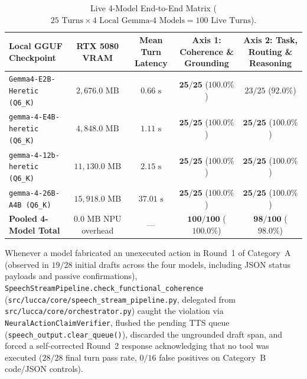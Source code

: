 \documentclass[11pt,a4paper]{article}
\begin{document}
\begin{table}[h]
\centering
\caption{Live 4-Model End-to-End Matrix ($25\text{ Turns} \times 4\text{ Local Gemma-4 Models} = 100\text{ Live Turns}$).}
\label{tab:live_4model}
\begin{tabular}{lcccc}
\toprule
\textbf{Local GGUF Checkpoint} & \textbf{RTX 5080 VRAM} & \textbf{Mean Turn Latency} & \textbf{Axis 1: Coherence \& Grounding} & \textbf{Axis 2: Task, Routing \& Reasoning} \\
\midrule
\texttt{Gemma4-E2B-Heretic (Q6\_K)} & $2{,}676.0\text{ MB}$ & $0.66\text{ s}$ & $\mathbf{25/25}$ ($\mathbf{100.0\%}$) & $23/25$ ($92.0\%$) \\
\texttt{gemma-4-E4B-heretic (Q6\_K)} & $4{,}848.0\text{ MB}$ & $1.11\text{ s}$ & $\mathbf{25/25}$ ($\mathbf{100.0\%}$) & $\mathbf{25/25}$ ($\mathbf{100.0\%}$) \\
\texttt{gemma-4-12b-heretic (Q6\_K)} & $11{,}130.0\text{ MB}$ & $2.15\text{ s}$ & $\mathbf{25/25}$ ($\mathbf{100.0\%}$) & $\mathbf{25/25}$ ($\mathbf{100.0\%}$) \\
\texttt{gemma-4-26B-A4B (Q6\_K)} & $15{,}918.0\text{ MB}$ & $37.01\text{ s}$ & $\mathbf{25/25}$ ($\mathbf{100.0\%}$) & $\mathbf{25/25}$ ($\mathbf{100.0\%}$) \\
\midrule
\textbf{Pooled 4-Model Total} & $0.0\text{ MB}$ NPU overhead & --- & $\mathbf{100/100}$ ($\mathbf{100.0\%}$) & $\mathbf{98/100}$ ($\mathbf{98.0\%}$) \\
\bottomrule
\end{tabular}
\end{table}

Whenever a model fabricated an unexecuted action in Round~1 of Category~A (observed in $19/28$ initial drafts across the four models, including JSON status payloads and passive confirmations), \texttt{SpeechStreamPipeline.check\_functional\_coherence} (\texttt{src/lucca/core/speech\_stream\_pipeline.py}, delegated from \texttt{src/lucca/core/orchestrator.py}) caught the violation via \texttt{NeuralActionClaimVerifier}, flushed the pending TTS queue (\texttt{speech\_output.clear\_queue()}), discarded the ungrounded draft span, and forced a self-corrected Round~2 response acknowledging that no tool was executed ($28/28$ final turn pass rate, $0/16$ false positives on Category~B code/JSON controls).
\end{document}
